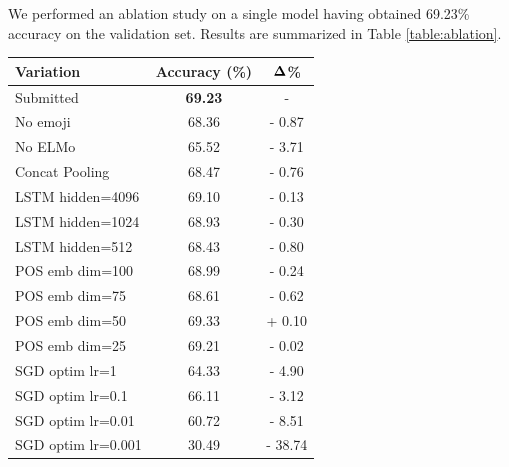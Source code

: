 \documentclass[11pt,a4paper]{article}
\begin{document}
We performed an ablation study on a single model having obtained 69.23\%
accuracy on the validation set. Results are summarized in Table
\ref{table:ablation}.

\begin{table}[!h]
    \centering
    \footnotesize

    \begin{tabular}{lcc}

        \textbf{Variation} & \textbf{Accuracy (\%)} & $\bf{\Delta}$\textbf{\%} \\
        \hline
        \hline
        Submitted          & \textbf{69.23}         & -                        \\
        \hline
        No emoji           & 68.36                  & - 0.87                   \\
        \hline
        No ELMo            & 65.52                  & - 3.71                   \\
        \hline
        Concat Pooling     & 68.47                  & - 0.76                   \\
        \hline
        LSTM hidden=4096   & 69.10                  & - 0.13                   \\
        LSTM hidden=1024   & 68.93                  & - 0.30                   \\
        LSTM hidden=512    & 68.43                  & - 0.80                   \\
        \hline
        POS emb dim=100    & 68.99                  & - 0.24                   \\
        POS emb dim=75     & 68.61                  & - 0.62                   \\
        POS emb dim=50     & 69.33                  & + 0.10                   \\
        POS emb dim=25     & 69.21                  & - 0.02                   \\
        \hline
        SGD optim lr=1     & 64.33                  & - 4.90                   \\
        SGD optim lr=0.1   & 66.11                  & - 3.12                   \\
        SGD optim lr=0.01  & 60.72                  & - 8.51                   \\
        SGD optim lr=0.001 & 30.49                  & - 38.74                  \\

    \end{tabular}


\end{table}
\end{document}
